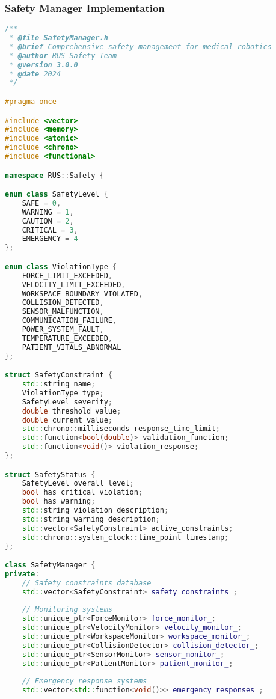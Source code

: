 \subsubsection{Safety Manager Implementation}

\begin{lstlisting}[language=C++, caption={Safety Manager Core Implementation}, label={lst:app-safety-manager}]
/**
 * @file SafetyManager.h
 * @brief Comprehensive safety management for medical robotics
 * @author RUS Safety Team
 * @version 3.0.0
 * @date 2024
 */

#pragma once

#include <vector>
#include <memory>
#include <atomic>
#include <chrono>
#include <functional>

namespace RUS::Safety {

enum class SafetyLevel {
    SAFE = 0,
    WARNING = 1,
    CAUTION = 2,
    CRITICAL = 3,
    EMERGENCY = 4
};

enum class ViolationType {
    FORCE_LIMIT_EXCEEDED,
    VELOCITY_LIMIT_EXCEEDED,
    WORKSPACE_BOUNDARY_VIOLATED,
    COLLISION_DETECTED,
    SENSOR_MALFUNCTION,
    COMMUNICATION_FAILURE,
    POWER_SYSTEM_FAULT,
    TEMPERATURE_EXCEEDED,
    PATIENT_VITALS_ABNORMAL
};

struct SafetyConstraint {
    std::string name;
    ViolationType type;
    SafetyLevel severity;
    double threshold_value;
    double current_value;
    std::chrono::milliseconds response_time_limit;
    std::function<bool(double)> validation_function;
    std::function<void()> violation_response;
};

struct SafetyStatus {
    SafetyLevel overall_level;
    bool has_critical_violation;
    bool has_warning;
    std::string violation_description;
    std::string warning_description;
    std::vector<SafetyConstraint> active_constraints;
    std::chrono::system_clock::time_point timestamp;
};

class SafetyManager {
private:
    // Safety constraints database
    std::vector<SafetyConstraint> safety_constraints_;
    
    // Monitoring systems
    std::unique_ptr<ForceMonitor> force_monitor_;
    std::unique_ptr<VelocityMonitor> velocity_monitor_;
    std::unique_ptr<WorkspaceMonitor> workspace_monitor_;
    std::unique_ptr<CollisionDetector> collision_detector_;
    std::unique_ptr<SensorMonitor> sensor_monitor_;
    std::unique_ptr<PatientMonitor> patient_monitor_;
    
    // Emergency response systems
    std::vector<std::function<void()>> emergency_responses_;
    

\end{lstlisting}
